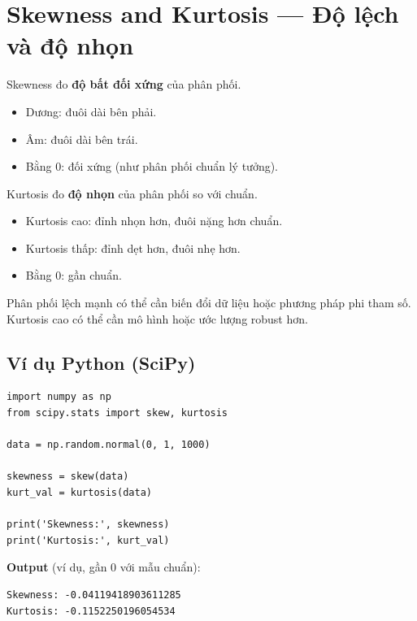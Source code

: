 \section{Skewness and Kurtosis --- Độ lệch và độ nhọn}
\label{sec:skewness-kurtosis}

\begin{dinhnghia}[title={Skewness (độ lệch)}]
Skewness đo \textbf{độ bất đối xứng} của phân phối.
\begin{itemize}
  \item Dương: đuôi dài bên phải.
  \item Âm: đuôi dài bên trái.
  \item Bằng 0: đối xứng (như phân phối chuẩn lý tưởng).
\end{itemize}
\end{dinhnghia}

\begin{dinhnghia}[title={Kurtosis (độ nhọn)}]
Kurtosis đo \textbf{độ nhọn} của phân phối so với chuẩn.
\begin{itemize}
  \item Kurtosis cao: đỉnh nhọn hơn, đuôi nặng hơn chuẩn.
  \item Kurtosis thấp: đỉnh dẹt hơn, đuôi nhẹ hơn.
  \item Bằng 0: gần chuẩn.
\end{itemize}
\end{dinhnghia}

\begin{ynghia}[title={Ảnh hưởng tới ML}]
Phân phối lệch mạnh có thể cần biến đổi dữ liệu hoặc phương pháp phi tham số.
Kurtosis cao có thể cần mô hình hoặc ước lượng robust hơn.
\end{ynghia}

\subsection{Ví dụ Python (SciPy)}

\begin{vidu}[title={skew() và kurtosis()}]
\begin{lstlisting}
import numpy as np
from scipy.stats import skew, kurtosis

data = np.random.normal(0, 1, 1000)

skewness = skew(data)
kurt_val = kurtosis(data)

print('Skewness:', skewness)
print('Kurtosis:', kurt_val)
\end{lstlisting}

\textbf{Output} (ví dụ, gần 0 với mẫu chuẩn):
\begin{lstlisting}
Skewness: -0.04119418903611285
Kurtosis: -0.1152250196054534
\end{lstlisting}
\end{vidu}

